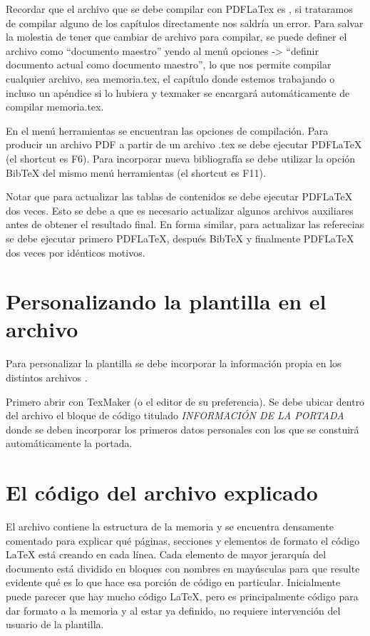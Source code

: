 Recordar que el archivo que se debe compilar con PDFLaTex es , si trataramos de compilar alguno de los capítulos directamente nos saldría un error.  Para salvar la molestia de tener que cambiar de archivo para compilar, se puede definer el archivo  como ``documento maestro'' yendo al menú opciones -> ``definir documento actual como documento maestro'', lo que nos permite compilar cualquier archivo, sea memoria.tex, el capítulo donde estemos trabajando o incluso un apéndice si lo hubiera y texmaker se encargará automáticamente de compilar memoria.tex.

En el menú herramientas se encuentran las opciones de compilación.  Para producir un archivo PDF a partir de un archivo .tex se debe ejecutar PDFLaTeX (el shortcut es F6). Para incorporar nueva bibliografía se debe utilizar la opción BibTeX del mismo menú herramientas (el shortcut es F11).

Notar que para actualizar las tablas de contenidos se debe ejecutar PDFLaTeX dos veces.  Esto se debe a que es necesario actualizar algunos archivos auxiliares antes de obtener el resultado final.  En forma similar, para actualizar las referecias se debe ejecutar primero PDFLaTeX, después BibTeX y finalmente PDFLaTeX dos veces por idénticos motivos.

\section{Personalizando la plantilla en el archivo }
\label{sec:FillingFile}

Para personalizar la plantilla se debe incorporar la información propia en los distintos archivos . 

Primero abrir  con TexMaker (o el editor de su preferencia). Se debe ubicar dentro del archivo el bloque de código titulado \emph{INFORMACIÓN DE LA PORTADA} donde se deben incorporar los primeros datos personales con los que se constuirá automáticamente la portada.



\section{El código del archivo  explicado}

El archivo  contiene la estructura de la memoria y se encuentra densamente comentado para explicar qué páginas, secciones y elementos de formato el código \LaTeX{} está creando en cada línea. Cada elemento de mayor jerarquía del documento está dividido en bloques con nombres en mayúsculas para que resulte evidente qué es lo que hace esa porción de código en particular. Inicialmente puede parecer que hay mucho código \LaTeX{}, pero es principalmente código para dar formato a la memoria y al estar ya definido, no requiere intervención del usuario de la plantilla.

